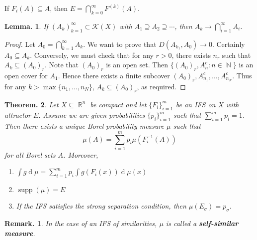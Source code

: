 \documentclass[11pt, a4paper]{memoir}
\DeclareMathOperator{\N}{{\mathbb{N}}}
\DeclareMathOperator{\R}{{\mathbb{R}}}
\theoremstyle{change}
\newtheorem{theorem}{Theorem.}[section]
\newtheorem{lemma}[theorem]{Lemma.}
\theoremstyle{plain}
\theoremstyle{nonumberplain}
\newtheorem{remark}{Remark.}
\newtheorem{proof}{Proof}
\DeclareMathOperator{\supp}{supp}
\renewcommand{\d}[1]{\ensuremath{\operatorname{d}\!{#1}}}
\newcommand{\defn}[1]{{\boldmath\bfseries #1}}
\numberwithin{equation}{section}
\begin{document}
If $F_i(A)\subseteq A$, then $E=\bigcap_{k=0}^\infty F^{(k)}(A)$.
\begin{lemma}
    If $(A_k)_{k=1}^\infty\subset\mathcal{K}(X)$ with $A_1\supseteq A_2\supseteq\cdots$, then $A_k\to\bigcap_{i=1}^\infty A_i$.
\end{lemma}
\begin{proof}
    Let $A_0=\bigcap_{k=1}^\infty A_k$.
    We want to prove that $D(A_{k_1},A_0)\to 0$.
    Certainly $A_0\subseteq A_k$.
    Conversely, we must check that for any $r>0$, there exists $n_r$ such that $A_k\subseteq (A_0)_r$.
    Note that $(A_0)_r$ is an open set.
    Then $\{(A_0)_r,A_n^c:n\in\N\}$ is an open cover for $A_1$.
    Hence there exists a finite subcover $(A_0)_r,A_{n_1}^c,\ldots,A_{n_N}^c$.
    Thus for any $k>\max\{n_1,\ldots,n_N\}$, $A_k\subseteq (A_0)_r$, as required.
\end{proof}
\begin{theorem}
    Let $X\subseteq\R^n$ be compact and let $\{F_i\}_{i=1}^m$ be an IFS on $X$ with attractor $E$.
    Assume we are given probabilities $\{p_i\}_{i=1}^m$ such that $\sum_{i=1}^mp_i=1$.
    Then there exists a unique Borel probability measure $\mu$ such that
    \begin{equation*}
        \mu(A)=\sum_{i=1}^m p_i\mu(F_i^{-1}(A))
    \end{equation*}
    for all Borel sets $A$.
    Moreover,
    \begin{enumerate}[nl,r]
        \item $\int g\d{\mu}=\sum_{i=1}^m p_i\int g(F_i(x))\d{\mu(x)}$
        \item $\supp(\mu)=E$
        \item If the IFS satisfies the strong separation condition, then $\mu(E_\sigma)=p_\sigma$.
    \end{enumerate}
\end{theorem}
\begin{remark}
    In the case of an IFS of similarities, $\mu$ is called a \defn{self-similar measure}.
\end{remark}
\end{document}
